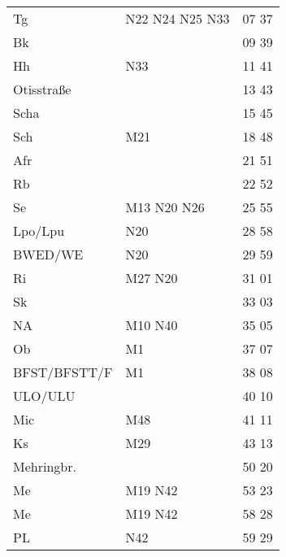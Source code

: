 \begin{tabular}{!{\color{schiefergrau}\vrule width 3pt}*{3}{l!{\color{schiefergrau}\vrule width 3pt}}}
\hline
{}
 \\
\hline
Tg           & \nbus{} N22 N24 N25 N33             & 07 37 \\
Bk           &                                     & 09 39 \\
Hh           & \nbus{} N33                         & 11 41 \\
Otisstraße   &                                     & 13 43 \\
Scha         &                                     & 15 45 \\
Sch          & \mbus{} M21                         & 18 48 \\
Afr          &                                     & 21 51 \\
Rb           &                                     & 22 52 \\
Se           & \mtram{} M13 \nbus{} N20 N26        & 25 55 \\
Lpo/Lpu      & \nuneun{} \nbus{} N20               & 28 58 \\
BWED/WE      & \nbus{} N20                         & 29 59 \\
Ri           & \mbus{} M27 \nbus{} N20             & 31 01 \\
Sk           &                                     & 33 03 \\
NA           & \mtram{} M10 \nbus{} N40            & 35 05 \\
Ob           & \mtram{} M1                         & 37 07 \\
BFST/BFSTT/F & \mtram{} M1                         & 38 08 \\
ULO/ULU      & \nuzwei{}                           & 40 10 \\
Mic          & \mbus{} M48                         & 41 11 \\
Ks           & \mbus{} M29                         & 43 13 \\
Mehringbr.   & \nueins{}                           & 50 20 \\
Me           & \nusieben{} \mbus{} M19 \nbus{} N42 & 53 23 \\
\hline
Me           & \nusieben{} \mbus{} M19 \nbus{} N42 & 58 28 \\
PL           & \nbus{} N42                         & 59 29 \\

\end{tabular}
